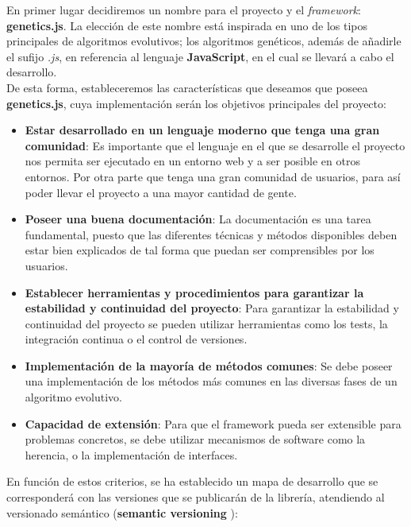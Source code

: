 En primer lugar decidiremos un nombre para el proyecto y el \textit{framework}: \textbf{genetics.js}. La elección de este nombre está inspirada en uno de los tipos principales de algoritmos evolutivos; los algoritmos genéticos, además de añadirle el sufijo \textit{.js}, en referencia al lenguaje \textbf{JavaScript}, en el cual se llevará a cabo el desarrollo. \\

De esta forma, estableceremos las características que deseamos que poseea \textbf{genetics.js}, cuya implementación serán los objetivos principales del proyecto:

\begin{itemize}
    \item \textbf{Estar desarrollado en un lenguaje moderno que tenga una gran comunidad}: Es importante que el lenguaje en el que se desarrolle el proyecto nos permita ser ejecutado en un entorno web y a ser posible en otros entornos. Por otra parte que tenga una gran comunidad de usuarios, para así poder llevar el proyecto a una mayor cantidad de gente.
    \item \textbf{Poseer una buena documentación}: La documentación es una tarea fundamental, puesto que las diferentes técnicas y métodos disponibles deben estar bien explicados de tal forma que puedan ser comprensibles por los usuarios.
    \item \textbf{Establecer herramientas y procedimientos para garantizar la estabilidad y continuidad del proyecto}: Para garantizar la estabilidad y continuidad del proyecto se pueden utilizar herramientas como los tests, la integración continua o el control de versiones.
    \item \textbf{Implementación de la mayoría de métodos comunes}: Se debe poseer una implementación de los métodos más comunes en las diversas fases de un algoritmo evolutivo.
    \item \textbf{Capacidad de extensión}: Para que el framework pueda ser extensible para problemas concretos, se debe utilizar mecanismos de software como la herencia, o la implementación de interfaces.
\end{itemize}

En función de estos criterios, se ha establecido un mapa de desarrollo que se corresponderá con las versiones que se publicarán de la librería, atendiendo al versionado semántico (\textbf{semantic versioning} \cite{semver}):

